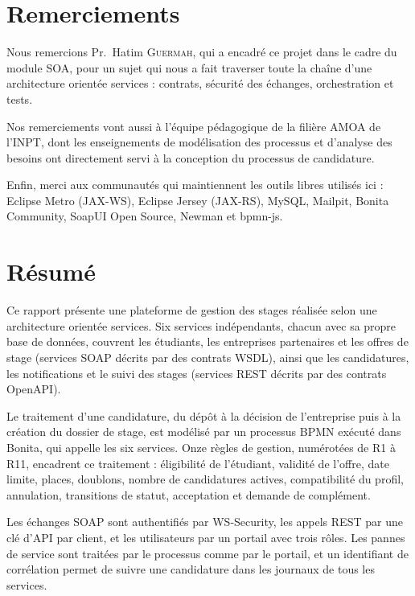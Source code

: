 \chapter*{Remerciements}

Nous remercions Pr.~Hatim \textsc{Guermah}, qui a encadré ce projet dans le cadre du module SOA, pour un sujet qui nous a fait traverser toute la chaîne d'une architecture orientée services : contrats, sécurité des échanges, orchestration et tests.

Nos remerciements vont aussi à l'équipe pédagogique de la filière AMOA de l'INPT, dont les enseignements de modélisation des processus et d'analyse des besoins ont directement servi à la conception du processus de candidature.

Enfin, merci aux communautés qui maintiennent les outils libres utilisés ici : Eclipse Metro (JAX-WS), Eclipse Jersey (JAX-RS), MySQL, Mailpit, Bonita Community, SoapUI Open Source, Newman et bpmn-js.

\chapter*{Résumé}

Ce rapport présente une plateforme de gestion des stages réalisée selon une architecture orientée services. Six services indépendants, chacun avec sa propre base de données, couvrent les étudiants, les entreprises partenaires et les offres de stage (services SOAP décrits par des contrats WSDL), ainsi que les candidatures, les notifications et le suivi des stages (services REST décrits par des contrats OpenAPI).

Le traitement d'une candidature, du dépôt à la décision de l'entreprise puis à la création du dossier de stage, est modélisé par un processus BPMN exécuté dans Bonita, qui appelle les six services. Onze règles de gestion, numérotées de R1 à R11, encadrent ce traitement : éligibilité de l'étudiant, validité de l'offre, date limite, places, doublons, nombre de candidatures actives, compatibilité du profil, annulation, transitions de statut, acceptation et demande de complément.

Les échanges SOAP sont authentifiés par WS-Security, les appels REST par une clé d'API par client, et les utilisateurs par un portail avec trois rôles. Les pannes de service sont traitées par le processus comme par le portail, et un identifiant de corrélation permet de suivre une candidature dans les journaux de tous les services.

